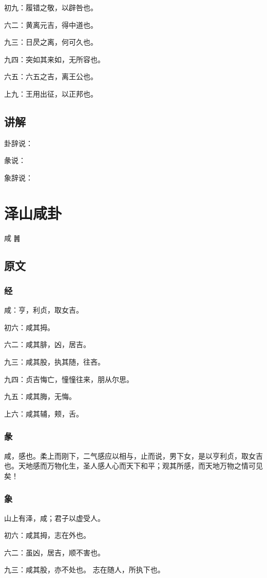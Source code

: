 \documentclass[12pt,oneside]{book}
\begin{document}
初九：履错之敬，以辟咎也。

六二：黄离元吉，得中道也。

九三：日昃之离，何可久也。

九四：突如其来如，无所容也。

六五：六五之吉，离王公也。

上九：王用出征，以正邦也。

\section{讲解}
卦辞说：

彖说：

象辞说：

\chapter{泽山咸卦}
咸 {\Large ䷞}

\section{原文}

\subsection{经}
咸：亨，利贞，取女吉。

初六：咸其拇。

六二：咸其腓，凶，居吉。

九三：咸其股，执其随，往吝。

九四：贞吉悔亡，憧憧往来，朋从尔思。

九五：咸其脢，无悔。

上六：咸其辅，颊，舌。

\subsection{彖}
咸，感也。柔上而刚下，二气感应以相与，止而说，男下女，是以亨利贞，取女吉也。天地感而万物化生，圣人感人心而天下和平；观其所感，而天地万物之情可见矣！

\subsection{象}
山上有泽，咸；君子以虚受人。

初六：咸其拇，志在外也。

六二：虽凶，居吉，顺不害也。

九三：咸其股，亦不处也。 志在随人，所执下也。
\end{document}
